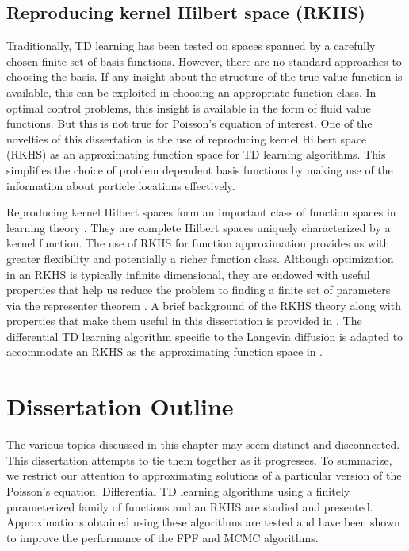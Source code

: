 \subsection{Reproducing kernel Hilbert space (RKHS)}
Traditionally, TD learning has been tested on spaces spanned by a carefully chosen finite set of basis functions. However, there are no standard approaches to choosing the basis.  If any insight about the structure of the true value function is available, this can be exploited in choosing an appropriate function class. In optimal control problems, this insight is available in the form of fluid value functions. But this is not true for Poisson's equation of interest. One of the novelties of this dissertation is the use of reproducing kernel Hilbert space (RKHS) as an approximating function space for TD learning algorithms. This simplifies the choice of problem dependent basis functions by making use of the information about particle locations effectively. 
 
Reproducing kernel Hilbert spaces form an important class of function spaces in learning theory \cite{aro50, schsmo01}. They are complete Hilbert spaces uniquely characterized by a kernel function. The use of RKHS for function approximation provides us with greater flexibility and potentially a richer function class. Although optimization in an RKHS is typically infinite dimensional, they are endowed with useful properties that help us reduce the problem to finding a finite set of parameters via the representer theorem \cite{kimwah71, schhersmo01}. A brief background of the RKHS theory along with properties that make them useful in this dissertation is provided in . The differential TD learning algorithm specific to the Langevin diffusion is adapted to accommodate an RKHS as the approximating function space in .
 

\section{Dissertation Outline}
The various topics discussed in this chapter may seem distinct and disconnected. This dissertation attempts to tie them together as it progresses. To summarize, we restrict our attention to approximating solutions of a particular version of the Poisson's equation. Differential TD learning algorithms using a finitely parameterized family of functions and an RKHS are studied and presented. Approximations obtained using these algorithms are tested and have been shown to improve the performance of the FPF and MCMC algorithms. 

